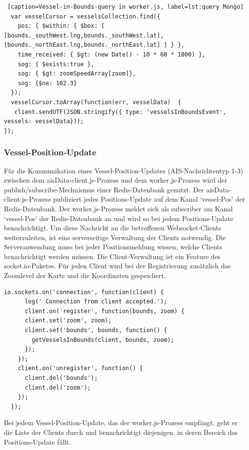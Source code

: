   \begin{lstlisting} [caption=Vessel-in-Bounds-query in worker.js, label=lst:query Mongo]
  var vesselCursor = vesselsCollection.find({
    pos: { $within: { $box: [ [bounds._southWest.lng,bounds._southWest.lat], [bounds._northEast.lng,bounds._northEast.lat] ] } },
    time_received: { $gt: (new Date() - 10 * 60 * 1000) },
    sog: { $exists:true },
    sog: { $gt: zoomSpeedArray[zoom]},
    sog: {$ne: 102.3}
  });
  vesselCursor.toArray(function(err, vesselData)  {
   client.sendUTF(JSON.stringify({ type: 'vesselsInBoundsEvent', vessels: vesselData}));
});
\end{lstlisting}

\subsubsection{Vessel-Position-Update}\label{Vessel-Position-Update}
Für die Kommunikation eines Vessel-Position-Updates (AIS-Nachrichtentyp 1-3) zwischen dem aisData-client.js-Prozess und dem worker.js-Prozess wird der publish/subscribe-Mechnismus einer Redis-Datenbank genutzt. Der aisData-client.js-Prozess publiziert jedes Positions-Update auf dem Kanal ‘vessel-Pos’ der Redis-Datenbank. Der worker.js-Prozess meldet sich als subscriber am Kanal ‘vessel-Pos’ der Redis-Datenbank an und wird so bei jedem Positions-Update benachrichtigt.
Um diese Nachricht an die betroffenen Websocket-Clients weiterzuleiten, ist eine serverseitige Verwaltung der Clients notwendig. Die Serveranwendung muss bei jeder Positionsmeldung wissen, welche Clients benachrichtigt werden müssen. Die Client-Verwaltung ist ein Feature des socket.io-Paketes. Für jeden Client wird bei der Registrierung zusätzlich das Zoomlevel der Karte und die Koordinaten gespeichert.
\begin{lstlisting}[caption= Speichern der übermittelten Client-Daten in worker.js, label=Speichern der übermittelten Client-Daten in worker.js]
io.sockets.on('connection', function(client) {
      log(' Connection from client accepted.');
      client.on('register', function(bounds, zoom) {
      client.set('zoom', zoom);
      client.set('bounds', bounds, function() {
        getVesselsInBounds(client, bounds, zoom);
      });
    });
    client.on('unregister', function() {
      client.del('bounds');
      client.del('zoom');
    });
  });
  \end{lstlisting}
  Bei jedem Vessel-Position-Update, das der worker.js-Prozess empfängt, geht er die Liste der Clients durch und benachrichtigt diejenigen, in deren Bereich das Positions-Update fällt.
